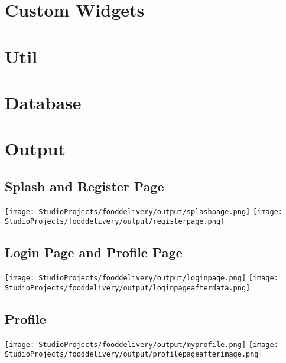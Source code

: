 \section{Custom Widgets}

\section{Util}

\section{Database}


\section{Output}
\subsection{Splash and Register Page}
\hspace{14pt}
\texttt{[image: StudioProjects/fooddelivery/output/splashpage.png]}
\hfill
\texttt{[image: StudioProjects/fooddelivery/output/registerpage.png]}

\vspace{15pt}
\subsection{Login Page and Profile Page}
\texttt{[image: StudioProjects/fooddelivery/output/loginpage.png]}
\hfill
\texttt{[image: StudioProjects/fooddelivery/output/loginpageafterdata.png]}



\vspace{10pt}
\subsection{Profile}

\texttt{[image: StudioProjects/fooddelivery/output/myprofile.png]}
\hfill
\texttt{[image: StudioProjects/fooddelivery/output/profilepageafterimage.png]}

